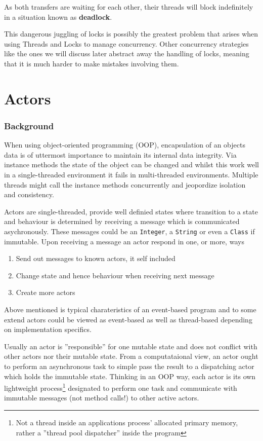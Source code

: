 \documentclass[a4paper,12pt]{kth-mag}
\begin{document}
As both transfers are waiting for each other, their threads will block indefinitely in a situation known as \textbf{deadlock}.

This dangerous juggling of locks is possibly the greatest problem that arises when using Threads and Locks to manage concurrency. Other concurrency strategies like the ones we will discuss later abstract away the handling of locks, meaning that it is much harder to make mistakes involving them.

\part{ Actors}

\section{Background}

When using object-oriented programming (OOP), encapsulation of an objects data is of uttermost importance to maintain its internal data integrity. Via instance methods the state of the object can be changed and whilst this work well in a single-threaded environment it fails in multi-threaded environments. Multiple threads might call the instance methods concurrently and jeopordize isolation and consistency. 

Actors are single-threaded, provide well definied states where transition to a state and behaviour is determined by receiving a message which is communicated asychronously. These messages could be an \texttt{Integer}, a \texttt{String} or even a \texttt{Class} if immutable. Upon receiving a message an actor respond in one, or more, ways \cite{scalaactors}

\begin{enumerate}
\item Send out messages to known actors, it self included
\item Change state and hence behaviour when receiving next message
\item Create more actors
\end{enumerate}

Above mentioned is typical charateristics of an event-based program and to some extend actors could be viewed as event-based as well as thread-based depending on implementation specifics.

Usually an actor is ''responsible'' for one mutable state and does not conflict with other actors nor their mutable state. From a computataional view, an actor ought to perform an asynchronous task to simple pass the result to a dispatching actor which holds the immutable state. Thinking in an OOP way, each actor is its own lightweight process\footnote{Not a thread inside an applications process' allocated primary memory, rather a ''thread pool dispatcher'' inside the program} designated to perform one task and communicate with immutable messages (not method calls!) to other active actors.
\end{document}

